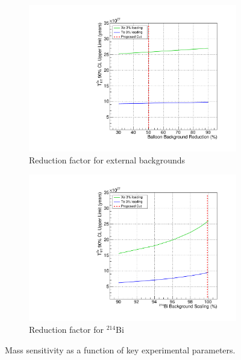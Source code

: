 \begin{figure}
\begin{subfigure}[b]{0.49\textwidth}
 \includegraphics[width=\textwidth]{dbd/externals_reduction_LT_cut.pdf}
 \caption{Reduction factor for external backgrounds}
 \label{fig:scale-ext}
\end{subfigure}
\begin{subfigure}[b]{0.49\textwidth}
 \includegraphics[width=\textwidth]{dbd/bi214_reduction_LT_cut.pdf}
 \caption{Reduction factor for $^{214}$Bi}
 \label{fig:scale-bi214}
\end{subfigure}
\caption{Mass sensitivity as a function of key experimental parameters.}
\label{fig:scaling-plots}
\end{figure}

